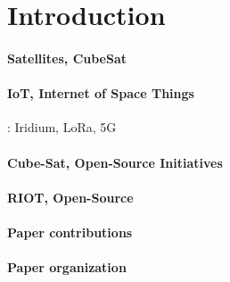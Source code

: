 

\section{Introduction}
\label{sec:introduction}

\paragraph*{Satellites, CubeSat}
\paragraph*{IoT, Internet of Space Things}: Iridium, LoRa, 5G
\paragraph*{Cube-Sat, Open-Source Initiatives}
\paragraph*{RIOT, Open-Source}
\paragraph*{Paper contributions}
\paragraph*{Paper organization} 

